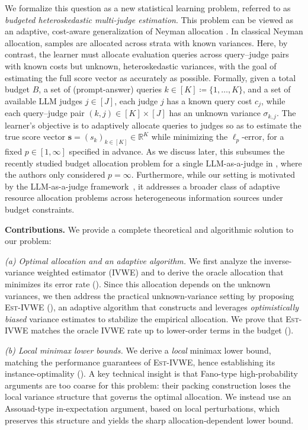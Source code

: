\documentclass{article}
\theoremstyle{plain}
\theoremstyle{definition}
\theoremstyle{plain}
\newcommand{\estivwe}{\textsc{Est-IVWE}}
\begin{document}
We formalize this question as a new statistical learning problem, referred to as \emph{{budgeted heteroskedastic multi-judge estimation}}. This problem can be viewed as an adaptive, cost-aware generalization of Neyman allocation \citep{neyman1934}. In classical Neyman allocation, samples are allocated across strata with known variances. Here, by contrast, the learner must allocate evaluation queries across query--judge pairs with known costs but unknown, heteroskedastic variances, with the goal of estimating the full score vector as accurately as possible. Formally, given a total budget \(B\), a set of (prompt-answer) queries \(k \in [K] \coloneq \{1,\ldots,K\}\), and a set of available LLM judges \(j \in [J]\), each judge \(j\) has a known query cost \(c_j\), while each query--judge pair \((k,j)\in [K]\times[J]\) has an unknown variance \(\sigma_{k,j}\). The learner’s objective is to adaptively allocate queries to judges so as to estimate the true score vector $\mathbf{s} = (s_k)_{k\in[K]} \in \mathbb{R}^K$ while minimizing the \(\ell_p\)-error, for a fixed \(p \in [1,\infty]\) specified in advance.
As we discuss later, this subsumes the recently studied budget allocation problem for a single LLM-as-a-judge in \cite{saha2026budget}, where the authors only considered $p = \infty$.
Furthermore, while our setting is motivated by the LLM-as-a-judge framework~\citep{saha2026budget}, it addresses a broader class of adaptive resource allocation problems across heterogeneous information sources under budget constraints.

\textbf{Contributions.} We provide a complete theoretical and algorithmic solution to our problem:

\emph{(a) Optimal allocation and an adaptive algorithm.} We first analyze the inverse-variance weighted estimator (IVWE) and to derive the oracle allocation that minimizes its error rate ({}). Since this allocation depends on the unknown variances, we then address the practical unknown-variance setting by proposing \estivwe{} (), an adaptive algorithm that constructs and leverages \emph{optimistically biased} variance estimates to stabilize the empirical allocation. We prove that \estivwe{} matches the oracle IVWE rate up to lower-order terms in the budget ({}). 

\emph{(b) Local minimax lower bounds.} We derive a \emph{local} minimax lower bound, matching the performance guarantees of \estivwe{}, hence establishing its instance-optimality ({}). A key technical insight is that Fano-type high-probability arguments are too coarse for this problem: their packing construction loses the local variance structure that governs the optimal allocation. We instead use an Assouad-type in-expectation argument, based on local perturbations, which preserves this structure and yields the sharp allocation-dependent lower bound.
\end{document}
